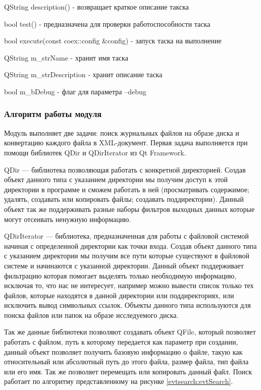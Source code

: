 QString description() - возвращает краткое описание такска

bool test() - предназначена для проверки работоспособности таска

bool execute(const coex::config \&config) - запуск таска на выполнение

QString m\_strName - хранит имя таска

QString m\_strDescription - хранит описание таска

bool m\_bDebug - флаг для параметра –debug

\subsubsection{Алгоритм работы модуля}

Модуль выполняет две задачи: поиск журнальных файлов на образе диска и конвертацию каждого файла в XML-документ. Первая задача выполняется при помощи библиотек QDir и QDirIterator из Qt Framework.

QDir — библиотека позволяющая работать с конкретной директорией. Создав объект данного типа с указанием директории мы получим доступ к этой директории в программе и сможем работать в ней (просматривать содержимое; удалять, создавать или копировать файлы; создавать поддиректории). Данный объект так же поддерживать разные наборы фильтров выходных данных которые могут отсеивать ненужную информацию.

QDirIterator — библиотека, предназначенная для работы с файловой системой начиная с определенной директории как точки входа. Создав объект данного типа с указанием директории мы получим все пути которые существуют в файловой системе и начинаются с указанной директории. Данный объект поддерживает фильтрацию которая помогает выделять только необходимую информацию, исключая то, что нас не интересует, например можно вывести список только тех файлов, которые находятся в данной директории или поддиректориях, или исключить вывод символьных ссылок. Объекты данного типа используются для поиска файлов или папок на образе исследуемого диска.

Так же данные библиотеки позволяют создавать объект QFile, который позволяет работать с файлом, путь к которому передается как параметр при создании, данный объект позволяет получить базовую информацию о файле, такую как относительный или абсолютный путь до этого файла, размер файла, тип файла или его имя. Так же позволяет перемещать или копировать данный файл. Поиск работает по алгоритму представленному на рисунке \ref{evtsearch:evtSearch}.


